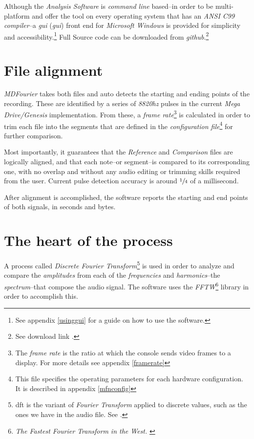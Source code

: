 \documentclass[10pt,a4paper]{report}
\newcommand{\define}[1]{\textit{\acrlong{#1}} (\textit{\acrshort{#1}})}
\newcommand{\hz}[1]{\textit{#1\acrshort{hz}}}
\begin{document}
Although the \textit{Analysis Software} is \textit{command line} based--in order to be multi-platform and offer the tool on every operating system that has an \textit{ANSI C99 compiler}--a \define{gui} front end for \textit{Microsoft Windows} is provided for simplicity and accessibility.\footnote{See appendix \ref{usinggui} for a guide on how to use the software.} Full Source code can be downloaded from \textit{github}.\footnote{See download link \cite{sourcecode}.}

\section{File alignment}

\textit{MDFourier} takes both files and auto detects the starting and ending points of the recording. These are identified by a series of \hz{8820} pulses in the current \textit{Mega Drive/Genesis} implementation. From these, a \textit{frame rate}\footnote{The \textit{frame rate} is the ratio at which the console sends video frames to a display. For more details see appendix \ref{framerate}} is calculated in order to trim each file into the segments that are defined in the \textit{configuration file}\footnote{This file specifies the operating parameters for each hardware configuration. It is described in appendix \ref{mfnconfig}} for further comparison.

Most importantly, it guarantees that the \textit{Reference} and \textit{Comparison} files are logically aligned, and that each note--or segment--is compared to its corresponding one, with no overlap and without any audio editing or trimming skills required from the user. Current pulse detection accuracy is around $\sfrac{1}{4}$ of a millisecond.

After alignment is accomplished, the software reports the starting and end points of both signals, in seconds and bytes.

\section{The heart of the process}

A process called \textit{Discrete Fourier Transform}\footnote{\gls{dft} is the variant of \textit{Fourier Transform} applied to discrete values, such as the ones we have in the audio file. See \cite{FourierTransformApps}.} is used in order to analyze and compare the \textit{amplitudes} from each of the \textit{frequencies} and \textit{harmonics}--the \textit{spectrum}--that compose the audio signal. The software uses the \textit{FFTW}\footnote{\textit{The Fastest Fourier Transform in the West.} \cite{fftw}} library in order to accomplish this.
\end{document}
